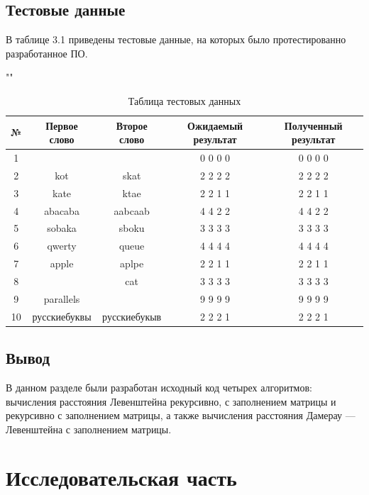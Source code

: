\documentclass[12pt]{report}
\begin{document}
\section{Тестовые данные}

В таблице 3.1 приведены тестовые данные, на которых было протестированно разработанное ПО.

\begin{table}[h]
	\begin{center}
		\caption{Таблица тестовых данных}
		""\newline
		\begin{tabular}{|c c c c c|} 
			\hline
			№ & Первое слово & Второе слово & Ожидаемый результат & Полученный результат \\ [0.8ex] 
			\hline
			1 &  &  & 0 0 0 0 & 0 0 0 0\\
			\hline
			2 & kot & skat & 2 2 2 2 & 2 2 2 2\\
			\hline
			3 & kate & ktae & 2 2 1 1 & 2 2 1 1\\
			\hline
			4 & abacaba & aabcaab & 4 4 2 2 & 4 4 2 2\\
			\hline
			5 & sobaka & sboku & 3 3 3 3 & 3 3 3 3\\
			\hline
			6 & qwerty & queue & 4 4 4 4 & 4 4 4 4\\
			\hline
			7 & apple & aplpe & 2 2 1 1  & 2 2 1 1\\
			\hline
			8 &  & cat & 3 3 3 3 & 3 3 3 3\\
			\hline
			9 & parallels &  & 9 9 9 9 & 9 9 9 9\\
			\hline
			10 & русскиебуквы & русскиебукыв & 2 2 2 1 & 2 2 2 1\\
			\hline
		\end{tabular}
	\end{center}
\end{table}

\section{Вывод}
В данном разделе были разработан исходный код четырех алгоритмов: вычисления расстояния Левенштейна рекурсивно, с заполнением матрицы и рекурсивно с заполнением матрицы, а также вычисления расстояния Дамерау — Левенштейна с заполнением матрицы.

\chapter{Исследовательская часть}
\end{document}
